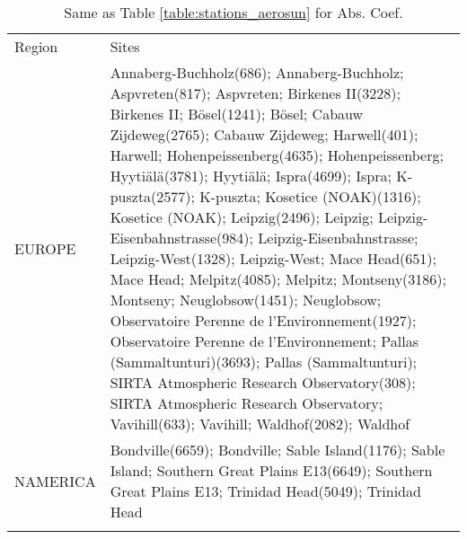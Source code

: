 \documentclass[journal abbreviation, manuscript]{copernicus}
\begin{document}
\begin{table}
 \tiny
 \begin{tabularx}{\textwidth}{lX}
  \tophline
  Region   & Sites                                                                                                                                                                                                                                                                                                                                                                                                                                                                                                                                                                                                                                                                                                                                                                                                                                                               \\
  \middlehline
  EUROPE   & Annaberg-Buchholz(686); Annaberg-Buchholz; Aspvreten(817); Aspvreten; Birkenes II(3228); Birkenes II; Bösel(1241); Bösel; Cabauw Zijdeweg(2765); Cabauw Zijdeweg; Harwell(401); Harwell; Hohenpeissenberg(4635); Hohenpeissenberg; Hyytiälä(3781); Hyytiälä; Ispra(4699); Ispra; K-puszta(2577); K-puszta; Kosetice (NOAK)(1316); Kosetice (NOAK); Leipzig(2496); Leipzig; Leipzig-Eisenbahnstrasse(984); Leipzig-Eisenbahnstrasse; Leipzig-West(1328); Leipzig-West; Mace Head(651); Mace Head; Melpitz(4085); Melpitz; Montseny(3186); Montseny; Neuglobsow(1451); Neuglobsow; Observatoire Perenne de l'Environnement(1927); Observatoire Perenne de l'Environnement; Pallas (Sammaltunturi)(3693); Pallas (Sammaltunturi); SIRTA Atmospheric Research Observatory(308); SIRTA Atmospheric Research Observatory; Vavihill(633); Vavihill; Waldhof(2082); Waldhof \\
  NAMERICA & Bondville(6659); Bondville; Sable Island(1176); Sable Island; Southern Great Plains E13(6649); Southern Great Plains E13; Trinidad Head(5049); Trinidad Head                                                                                                                                                                                                                                                                                                                                                                                                                                                                                                                                                                                                                                                                                                        \\
  \bottomhline
 \end{tabularx}
 \caption{Same as Table \ref{table:stations_aerosun} for Abs. Coef.}
 \label{table:stations_abs}
\end{table}
\end{document}
